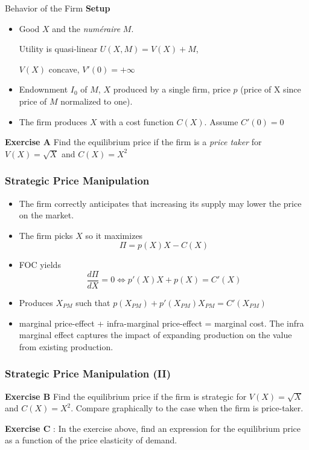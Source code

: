 \documentclass[handout]{beamer}
\newenvironment{iPar}[1]{\textbf{#1} \begin{itemize}}{\end{itemize}}
\newcommand{\mdp}{\medskip \pause}
\begin{document}
\begin{frame}{Behavior of the Firm}
\begin{iPar}{Setup}
\item  Good $X$ and the \textit{numéraire} $M$.\smallskip

 Utility is quasi-linear $U(X,M) = V(X) + M$,
 
  $V(X)$ concave, $V'(0) = + \infty$
\item  Endownment $I_0$ of $M$, $X$ produced by a single firm, price $p$ (price of X since price of $M$ normalized to one). 
\item   The firm produces $X$ with a cost function $C(X)$. Assume $C'(0) = 0$
\end{iPar} \mdp 
\textbf{Exercise A} Find the equilibrium price if the firm is a \textit{price taker} for $V(X) = \sqrt{X}$ and $C(X) = X^2$
\end{frame}


\begin{frame}\frametitle{Strategic Price Manipulation}

\begin{itemize} \item The firm correctly anticipates that increasing its supply may lower the price on the market. 
\item The firm picks $X$ so it maximizes $$\Pi = p(X)X - C(X)$$
\item FOC yields $$\frac{d\Pi}{dX} = 0 \iff p'(X)X + p(X) = C'(X)$$
\item Produces $X_{PM}$ such that  $   p(X_{PM}) + p'(X_{PM}) X_{PM} = C'(X_{PM}) $ \mdp
\item marginal price-effect + infra-marginal price-effect  = marginal cost. The infra marginal effect captures the impact of expanding production on the value from existing production.\end{itemize}
\end{frame}



\begin{frame}\frametitle{Strategic Price Manipulation (II)}

\textbf{Exercise B} Find the equilibrium price if the firm is strategic for $V(X) = \sqrt{X}$ and $C(X) = X^2$. Compare graphically to the case when the firm is price-taker. 

\textbf{Exercise C} : In the exercise above, find an expression for the equilibrium price as a function of the price elasticity of demand.  

\end{frame}
\end{document}
